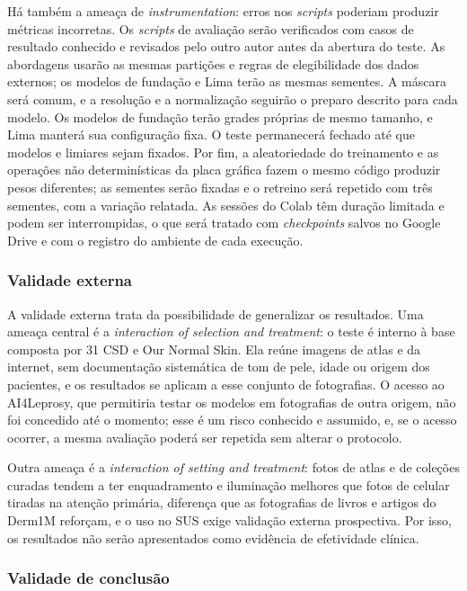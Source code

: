 Há também a ameaça de \textit{instrumentation}: erros nos \textit{scripts}
poderiam produzir métricas incorretas. Os \textit{scripts} de avaliação
serão verificados com casos de resultado conhecido e revisados pelo outro
autor antes da abertura do teste. As abordagens usarão as mesmas partições
e regras de elegibilidade dos dados externos; os modelos de fundação e
Lima terão as mesmas sementes. A máscara será comum, e a resolução e a
normalização seguirão o preparo descrito para cada modelo. Os modelos de
fundação terão grades próprias de mesmo tamanho, e Lima manterá sua
configuração fixa. O teste permanecerá fechado até que modelos e limiares
sejam fixados. Por fim, a aleatoriedade do treinamento e as
operações não determinísticas da placa gráfica fazem o mesmo código produzir
pesos diferentes; as sementes serão fixadas e o retreino será repetido com
três sementes, com a variação relatada. As sessões do Colab têm duração
limitada e podem ser interrompidas, o que será tratado com
\textit{checkpoints} salvos no Google Drive e com o registro do ambiente de
cada execução.

\subsubsection*{Validade externa}

A validade externa trata da possibilidade de generalizar os resultados. Uma
ameaça central é a \textit{interaction of selection and treatment}: o teste
é interno à base composta por 31 CSD e Our Normal Skin. Ela reúne imagens
de atlas e da internet, sem documentação sistemática de tom de pele, idade
ou origem dos pacientes, e os resultados se aplicam a esse conjunto de
fotografias. O acesso ao AI4Leprosy, que
permitiria testar os modelos em fotografias de outra origem, não foi concedido
até o momento; esse é um risco conhecido e assumido, e, se o acesso ocorrer,
a mesma avaliação poderá ser repetida sem alterar o protocolo.

Outra ameaça é a \textit{interaction of setting and treatment}: fotos de
atlas e de coleções curadas tendem a ter enquadramento e iluminação melhores
que fotos de celular tiradas na atenção primária, diferença que as
fotografias de livros e artigos do Derm1M reforçam, e o uso no SUS exige
validação externa prospectiva. Por isso, os resultados não serão
apresentados como evidência de efetividade clínica.

\subsubsection*{Validade de conclusão}

